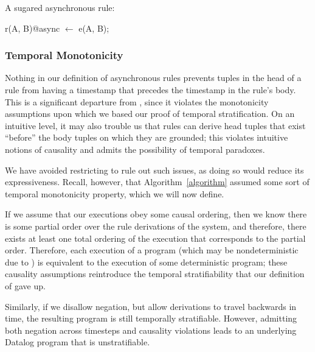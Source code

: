 \begin{example}
	A sugared asynchronous \lang rule:
	
\begin{Dedalus}
r(A, B)@async \(\leftarrow\) e(A, B);
\end{Dedalus}
\end{example}

\subsubsection{Temporal Monotonicity}


Nothing in our definition of asynchronous rules prevents tuples in the
head of a rule from having a timestamp that precedes the timestamp in
the rule's body. This is a significant departure from \slang, since it
violates the monotonicity assumptions upon which we based our proof of
temporal stratification.  On an intuitive level, it may also trouble
us that rules can derive head tuples that exist ``before'' the body
tuples on which they are grounded; this violates intuitive notions of
causality and admits the possibility of temporal paradoxes.

We have avoided restricting \lang to rule out such issues, as doing so
would reduce its expressiveness.  Recall, however, that
Algorithm~\ref{algorithm} assumed some sort of temporal monotonicity
property, which we will now define.

%

If we assume that our executions obey some causal ordering, then we
know there is some partial order over the rule derivations of the
system, and therefore, there exists at least one total ordering of the
execution that corresponds to the partial order.  Therefore, each
execution of a \lang program (which may be nondeterministic due to
) is equivalent to the execution of some deterministic \slang
program; these causality assumptions reintroduce the temporal stratifiability
that our definition of \lang gave up.

Similarly, if we disallow negation, but allow derivations to travel
backwards in time, the resulting \lang program is still temporally
stratifiable.  However, admitting both negation across timesteps and
causality violations leads to an underlying Datalog program that is
unstratifiable.

